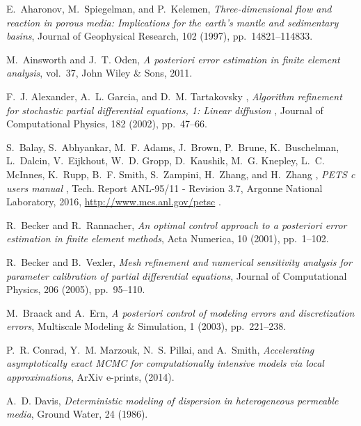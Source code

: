 \documentclass[review]{siamart0516}
\providecommand{\DIFaddtex}[1]{{\protect\color{blue} \sf #1}} %
\providecommand{\DIFaddbegin}{} %
\providecommand{\DIFaddend}{} %
\providecommand{\DIFadd}[1]{\texorpdfstring{\DIFaddtex{#1}}{#1}} %
\newcommand{\DIFaddincludegraphics}[2][]{{\color{blue}\fbox{\DIFOincludegraphics[#1]{#2}}}} %
\DeclareRobustCommand{\DIFaddbegin}{\DIFOaddbegin \let\includegraphics\DIFaddincludegraphics} %
\DeclareRobustCommand{\DIFaddend}{\DIFOaddend \let\includegraphics\DIFOincludegraphics} %
\begin{document}

\begin{thebibliography}{10}

{\sc E.~Aharonov, M.~Spiegelman, and P.~Kelemen}, {\em Three-dimensional flow
  and reaction in porous media: Implications for the earth's mantle and
  sedimentary basins}, Journal of Geophysical Research, 102 (1997),
  pp.~14821--114833.

{\sc M.~Ainsworth and J.~T. Oden}, {\em A posteriori error estimation in finite
  element analysis}, vol.~37, John Wiley \& Sons, 2011.

\DIFaddbegin {}
{\sc \DIFadd{F.~J. Alexander, A.~L. Garcia, and D.~M. Tartakovsky}}\DIFadd{, }{\em \DIFadd{Algorithm
  refinement for stochastic partial differential equations, 1: Linear
  diffusion}}\DIFadd{, Journal of Computational Physics, 182 (2002), pp.~47--66.
}

{\sc \DIFadd{S.~Balay, S.~Abhyankar, M.~F. Adams, J.~Brown, P.~Brune, K.~Buschelman,
  L.~Dalcin, V.~Eijkhout, W.~D. Gropp, D.~Kaushik, M.~G. Knepley, L.~C.
  McInnes, K.~Rupp, B.~F. Smith, S.~Zampini, H.~Zhang, and H.~Zhang}}\DIFadd{, }{\em
  {\DIFadd{PETS}}\DIFadd{c users manual}}\DIFadd{, Tech. Report ANL-95/11 - Revision 3.7, Argonne
  National Laboratory, 2016, }\url{http://www.mcs.anl.gov/petsc}\DIFadd{.
}

\DIFaddend {}
{\sc R.~Becker and R.~Rannacher}, {\em An optimal control approach to a
  posteriori error estimation in finite element methods}, Acta Numerica, 10
  (2001), pp.~1--102.

{\sc R.~Becker and B.~Vexler}, {\em Mesh refinement and numerical sensitivity
  analysis for parameter calibration of partial differential equations},
  Journal of Computational Physics, 206 (2005), pp.~95--110.

{\sc M.~Braack and A.~Ern}, {\em A posteriori control of modeling errors and
  discretization errors}, Multiscale Modeling \& Simulation, 1 (2003),
  pp.~221--238.

{\sc P.~R. Conrad, Y.~M. Marzouk, N.~S. Pillai, and A.~Smith}, {\em
  Accelerating asymptotically exact {MCMC} for computationally intensive models
  via local approximations}, ArXiv e-prints,  (2014).

{\sc A.~D. Davis}, {\em Deterministic modeling of dispersion in heterogeneous
  permeable media}, Ground Water, 24 (1986).


\end{thebibliography}
\end{document}
